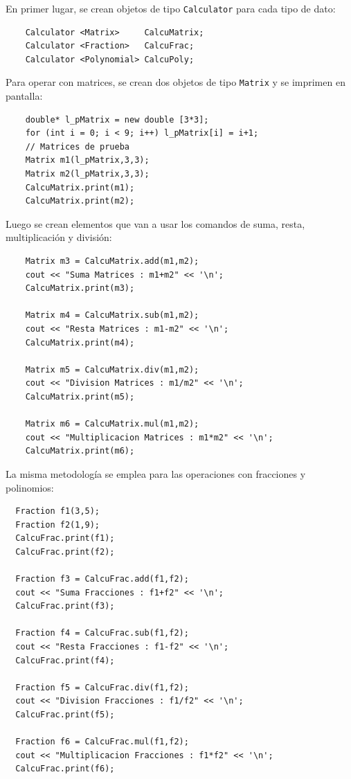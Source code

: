 En primer lugar, se crean objetos de tipo \texttt{Calculator} para cada tipo de dato:

\begin{verbatim}
    Calculator <Matrix>     CalcuMatrix;
    Calculator <Fraction>   CalcuFrac;
    Calculator <Polynomial> CalcuPoly;
\end{verbatim}

Para operar con matrices, se crean dos objetos de tipo \texttt{Matrix} y se imprimen en pantalla:

\begin{verbatim}
    double* l_pMatrix = new double [3*3];
    for (int i = 0; i < 9; i++) l_pMatrix[i] = i+1;
    // Matrices de prueba
    Matrix m1(l_pMatrix,3,3);
    Matrix m2(l_pMatrix,3,3);
    CalcuMatrix.print(m1);
    CalcuMatrix.print(m2);
\end{verbatim}

Luego se crean elementos que van a usar los comandos de suma, resta, multiplicación y división:

\begin{verbatim}
    Matrix m3 = CalcuMatrix.add(m1,m2);
    cout << "Suma Matrices : m1+m2" << '\n';
    CalcuMatrix.print(m3);
    
    Matrix m4 = CalcuMatrix.sub(m1,m2);
    cout << "Resta Matrices : m1-m2" << '\n';
    CalcuMatrix.print(m4);
    
    Matrix m5 = CalcuMatrix.div(m1,m2);
    cout << "Division Matrices : m1/m2" << '\n';
    CalcuMatrix.print(m5);
    
    Matrix m6 = CalcuMatrix.mul(m1,m2);
    cout << "Multiplicacion Matrices : m1*m2" << '\n';
    CalcuMatrix.print(m6);
\end{verbatim}


La misma metodología se emplea para las operaciones con fracciones y polinomios:

\begin{verbatim}
  Fraction f1(3,5);
  Fraction f2(1,9);
  CalcuFrac.print(f1);
  CalcuFrac.print(f2);
  
  Fraction f3 = CalcuFrac.add(f1,f2);
  cout << "Suma Fracciones : f1+f2" << '\n';
  CalcuFrac.print(f3);
  
  Fraction f4 = CalcuFrac.sub(f1,f2);
  cout << "Resta Fracciones : f1-f2" << '\n';
  CalcuFrac.print(f4);
  
  Fraction f5 = CalcuFrac.div(f1,f2);
  cout << "Division Fracciones : f1/f2" << '\n';
  CalcuFrac.print(f5);
  
  Fraction f6 = CalcuFrac.mul(f1,f2);
  cout << "Multiplicacion Fracciones : f1*f2" << '\n';
  CalcuFrac.print(f6);
\end{verbatim}


